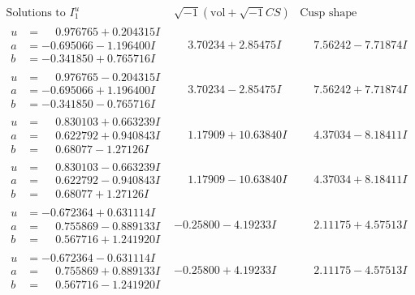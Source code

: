 \documentclass[1p]{elsarticle_modified}
\theoremstyle{definition}
\newcommand{\I}{\sqrt{-1}}
\begin{document}
$$\begin{array}{c|c|c}  
\text{Solutions to }I^u_{1}& \I (\text{vol} + \sqrt{-1}CS) & \text{Cusp shape}\\
 \hline 
\begin{aligned}
u &= \phantom{-}0.976765 + 0.204315 I \\
a &= -0.695066 - 1.196400 I \\
b &= -0.341850 + 0.765716 I\end{aligned}
 & \phantom{-}3.70234 + 2.85475 I & \phantom{-}7.56242 - 7.71874 I \\ \hline\begin{aligned}
u &= \phantom{-}0.976765 - 0.204315 I \\
a &= -0.695066 + 1.196400 I \\
b &= -0.341850 - 0.765716 I\end{aligned}
 & \phantom{-}3.70234 - 2.85475 I & \phantom{-}7.56242 + 7.71874 I \\ \hline\begin{aligned}
u &= \phantom{-}0.830103 + 0.663239 I \\
a &= \phantom{-}0.622792 + 0.940843 I \\
b &= \phantom{-}0.68077 - 1.27126 I\end{aligned}
 & \phantom{-}1.17909 + 10.63840 I & \phantom{-}4.37034 - 8.18411 I \\ \hline\begin{aligned}
u &= \phantom{-}0.830103 - 0.663239 I \\
a &= \phantom{-}0.622792 - 0.940843 I \\
b &= \phantom{-}0.68077 + 1.27126 I\end{aligned}
 & \phantom{-}1.17909 - 10.63840 I & \phantom{-}4.37034 + 8.18411 I \\ \hline\begin{aligned}
u &= -0.672364 + 0.631114 I \\
a &= \phantom{-}0.755869 - 0.889133 I \\
b &= \phantom{-}0.567716 + 1.241920 I\end{aligned}
 & -0.25800 - 4.19233 I & \phantom{-}2.11175 + 4.57513 I \\ \hline\begin{aligned}
u &= -0.672364 - 0.631114 I \\
a &= \phantom{-}0.755869 + 0.889133 I \\
b &= \phantom{-}0.567716 - 1.241920 I\end{aligned}
 & -0.25800 + 4.19233 I & \phantom{-}2.11175 - 4.57513 I \\ \hline\begin{aligned}

\end{aligned}
\end{array}$$
\end{document}
